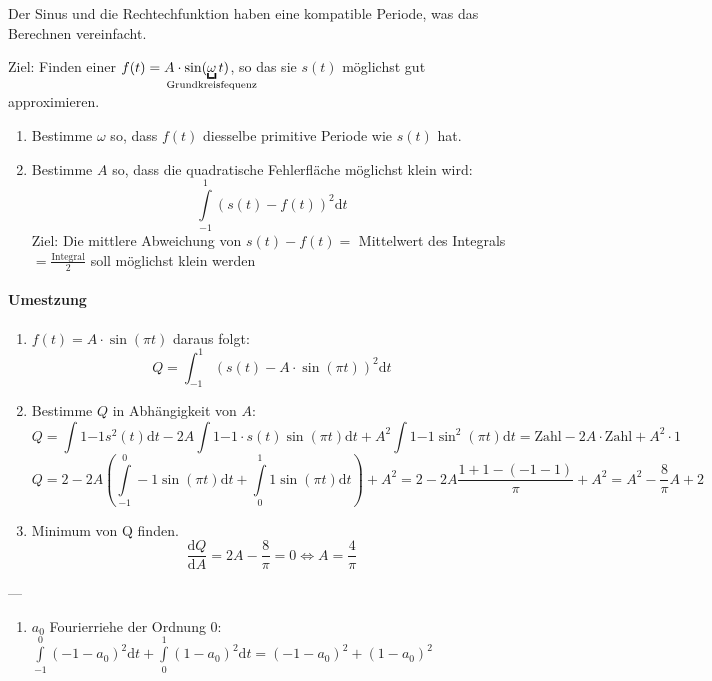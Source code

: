 
Der Sinus und die Rechtechfunktion haben eine kompatible Periode, was das Berechnen vereinfacht.

Ziel: Finden einer $f(t) = A \cdot \sin(\underbracket{\omega}_{\mathclap{\text{Grundkreisfequenz}}} t)$, so das sie $s(t)$ möglichst gut approximieren.

\begin{enumerate}
	\item Bestimme $\omega$ so, dass $f(t)$ diesselbe primitive Periode wie $s(t)$ hat.
	\item Bestimme $A$ so, dass die quadratische Fehlerfläche möglichst klein wird:
		\[
			\int\limits^1_{-1}(s(t) - f(t))^2 \mathrm{d}t
		\]
		Ziel: Die mittlere Abweichung von $s(t)-f(t)= $ Mittelwert des Integrals $= \frac{\text{Integral}}{2}$ soll möglichst klein werden 
\end{enumerate}

\paragraph{Umestzung}

\begin{enumerate}
	\item	$f(t) = A \cdot \sin(\pi t)$ daraus folgt:
	\[
		Q = \int^1_{-1}\left(s\left(t\right) - A \cdot \sin\left(\pi t\right)\right)^2 \mathrm{d}t
	\]
	\item	Bestimme $Q$ in Abhängigkeit von $A$:
	\[
		Q = \int\limits{1}{-1} s^2(t) \mathrm{d}t -2A \int\limits{1}{-1} \cdot s(t) \sin(\pi t) \mathrm{d}t + A^2 \int\limits{1}{-1} \sin^2(\pi t) \mathrm{d}t = \text{Zahl} - 2A \cdot \text{Zahl} + A^2 \cdot 1 
	\]
	\[
		Q = 2 - 2A\left( \int\limits^0_{-1} -1 \sin(\pi t) \mathrm{d}t + \int\limits^1_0 1 \sin(\pi t) \mathrm{d}t\right) + A^2 = 2 -2A \frac{1 + 1 - (-1 -1)}{\pi} + A^2 = A^2 - \frac{8}{\pi} A + 2
	\]
	\item Minimum von Q finden. 
	\[
		\frac{\mathrm{d}Q}{\mathrm{d}A} = 2A - \frac{8}\pi = 0 \Leftrightarrow A = \frac{4}\pi
	\]
\end{enumerate}
\----
\begin{enumerate}
	\item	$a_0$ Fourierriehe der Ordnung 0: $\int\limits^0_{-1}(-1-a_0)^2 \mathrm{d}t + \int\limits^1_0(1-a_0)^2 \mathrm{d}t = (-1-a_0)^2 + (1-a_0)^2$
	
	
\end{enumerate}


